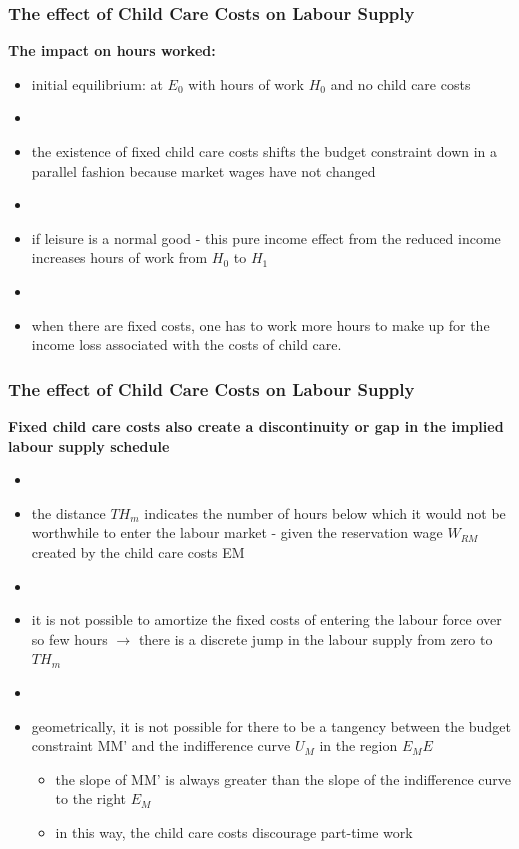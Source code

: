 \documentclass[blue]{beamer}
\begin{document}
 
    \begin{frame}
  \frametitle{The effect of Child Care Costs on Labour Supply}
\textbf{The impact on hours worked:}

\begin{itemize}

\item initial equilibrium:  at $E_{0}$ with hours of work $H_{0}$  and no child care costs
\item[]
\item the existence of fixed child care costs shifts the budget constraint down in a parallel fashion because market wages have not changed

\item[]
\item if leisure is a normal good - this pure income effect from the reduced income increases hours of work from $H_{0}$ to $H_{1}$ 
\item[]
\item when there are fixed costs, one has to work more hours to make up for the income loss associated with the costs of child care.

\end{itemize}

\end{frame}  
 
 
     \begin{frame}
  \frametitle{The effect of Child Care Costs on Labour Supply}



\textbf{Fixed child care costs also create a discontinuity or gap in the implied labour supply schedule}

\begin{itemize}
\item[]
\item the distance $TH_{m}$ indicates the number of hours below which it would not be worthwhile to enter the labour market - given the reservation wage $W_{RM}$ created by the child care costs EM

\item[]
\item it is not possible to amortize the fixed costs of entering the labour force over so few hours $\rightarrow$ there is a discrete jump in the labour supply from zero to $TH_{m}$ 
\item[]
\item geometrically,  it is not possible for there to be a tangency between the budget constraint MM' and the indifference curve $U_{M}$ in the region $E_{M}E$

\begin{itemize}
\item the slope of MM' is always greater than the slope of the indifference curve to the right $E_{M}$
\item in this way,  the child care costs discourage part-time work
\end{itemize}

\end{itemize}

\end{frame}  
 
\end{document}
